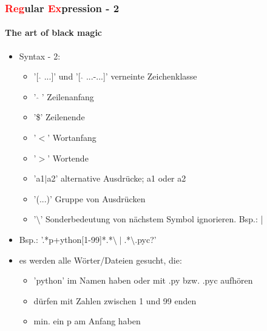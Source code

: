 \documentclass[12pt,utf8]{beamer}
\begin{document}
\begin{frame}
\frametitle{\textcolor{red}{Reg}ular \textcolor{red}{Ex}pression - 2}
\framesubtitle{The art of black magic}
\begin{itemize}
	\item Syntax - 2:
	\begin{itemize}
		\item '[ $\hat{}$ ...]' und '[ $\hat{}$ ...-...]' verneinte Zeichenklasse
		\item ' $\hat{}$ ' Zeilenanfang
		\item '\$' Zeilenende
		\item '$<$' Wortanfang
		\item '$>$' Wortende
		\item 'a1$\mid$a2' alternative Ausdrücke; a1 oder a2
		\item '(...)' Gruppe von Ausdrücken
		\item '$\setminus$' Sonderbedeutung von nächstem Symbol ignorieren. Bsp.: |
	\end{itemize}
	\item Bsp.: '.*p+ython[1-99]*.*$\setminus\mid$.*$\setminus$.pyc?'
	\item es werden alle Wörter/Dateien gesucht, die:
	\begin{itemize}
		\item 'python' im Namen haben oder mit .py bzw. .pyc aufhören
		\item dürfen mit Zahlen zwischen 1 und 99 enden
		\item min. ein p am Anfang haben
	\end{itemize}
\end{itemize}
\end{frame}
\end{document}
